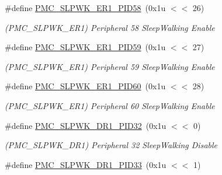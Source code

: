 \begin{DoxyCompactItemize}
\mbox{\label{group__SAMS70__PMC_ga7fdf8770dbdad26596591bc1cee4dcbd}} 
\#define \mbox{\hyperlink{group__SAMS70__PMC_ga7fdf8770dbdad26596591bc1cee4dcbd}{P\+M\+C\+\_\+\+S\+L\+P\+W\+K\+\_\+\+E\+R1\+\_\+\+P\+I\+D58}}~(0x1u $<$$<$ 26)
\begin{DoxyCompactList}\small\item\em (P\+M\+C\+\_\+\+S\+L\+P\+W\+K\+\_\+\+E\+R1) Peripheral 58 Sleep\+Walking Enable \end{DoxyCompactList}\item 
\mbox{\label{group__SAMS70__PMC_ga1519c9318deeedd834662d5ad7374bf1}} 
\#define \mbox{\hyperlink{group__SAMS70__PMC_ga1519c9318deeedd834662d5ad7374bf1}{P\+M\+C\+\_\+\+S\+L\+P\+W\+K\+\_\+\+E\+R1\+\_\+\+P\+I\+D59}}~(0x1u $<$$<$ 27)
\begin{DoxyCompactList}\small\item\em (P\+M\+C\+\_\+\+S\+L\+P\+W\+K\+\_\+\+E\+R1) Peripheral 59 Sleep\+Walking Enable \end{DoxyCompactList}\item 
\mbox{\label{group__SAMS70__PMC_ga780fe16c095a2bc0502c5a43bebea374}} 
\#define \mbox{\hyperlink{group__SAMS70__PMC_ga780fe16c095a2bc0502c5a43bebea374}{P\+M\+C\+\_\+\+S\+L\+P\+W\+K\+\_\+\+E\+R1\+\_\+\+P\+I\+D60}}~(0x1u $<$$<$ 28)
\begin{DoxyCompactList}\small\item\em (P\+M\+C\+\_\+\+S\+L\+P\+W\+K\+\_\+\+E\+R1) Peripheral 60 Sleep\+Walking Enable \end{DoxyCompactList}\item 
\mbox{\label{group__SAMS70__PMC_gac3df64c7f8916cf9325762a80fd9ee80}} 
\#define \mbox{\hyperlink{group__SAMS70__PMC_gac3df64c7f8916cf9325762a80fd9ee80}{P\+M\+C\+\_\+\+S\+L\+P\+W\+K\+\_\+\+D\+R1\+\_\+\+P\+I\+D32}}~(0x1u $<$$<$ 0)
\begin{DoxyCompactList}\small\item\em (P\+M\+C\+\_\+\+S\+L\+P\+W\+K\+\_\+\+D\+R1) Peripheral 32 Sleep\+Walking Disable \end{DoxyCompactList}\item 
\mbox{\label{group__SAMS70__PMC_ga707ff967774e6bb8804d0fbaad7cee81}} 
\#define \mbox{\hyperlink{group__SAMS70__PMC_ga707ff967774e6bb8804d0fbaad7cee81}{P\+M\+C\+\_\+\+S\+L\+P\+W\+K\+\_\+\+D\+R1\+\_\+\+P\+I\+D33}}~(0x1u $<$$<$ 1)
$$
\end{DoxyCompactItemize}
